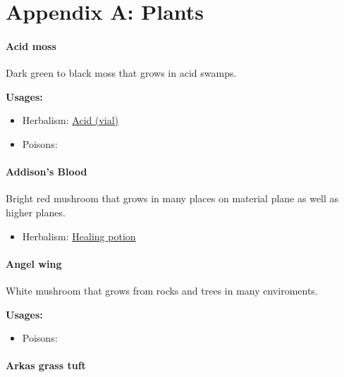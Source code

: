 \chapter*{Appendix A: Plants}

\subsubsection{Acid moss}
\label{acid_moss}

Dark green to black moss that grows in acid swamps.

\vspace{5mm}

\textbf{Usages:}

\begin{itemize}[noitemsep]
\item[] Herbalism: \hyperref[acid_vial]{Acid (vial)}
\item[] Poisons: \poison
\end{itemize}

\subsubsection{Addison's Blood}
\label{addisons_blood}

Bright red mushroom that grows in many places on material plane as well as higher planes.

\begin{itemize}[noitemsep]
\item[] Herbalism: \hyperref[healing_potion]{Healing potion}
\end{itemize}

\subsubsection{Angel wing}
\label{Angel wing}

White mushroom that grows from rocks and trees in many enviroments.

\vspace{5mm}

\textbf{Usages:}

\begin{itemize}[noitemsep]
\item[] Poisons: \poison
\end{itemize}

\subsubsection{Arkas grass tuft}
\label{Arkas grass tuft}

